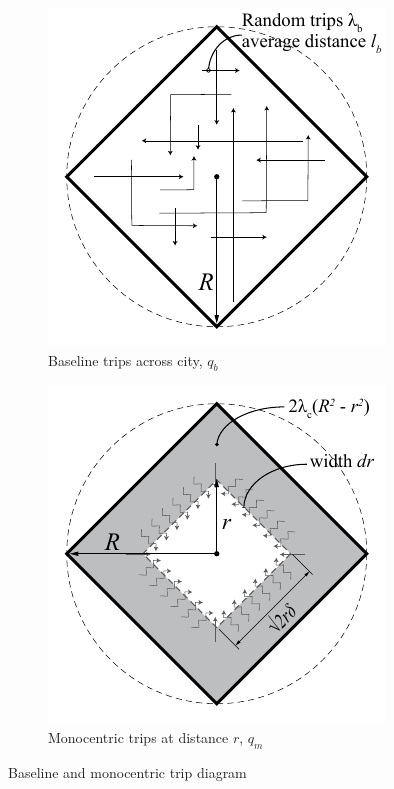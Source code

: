 \documentclass{elsarticle}\usepackage[]{graphicx}\usepackage[]{color}
\begin{document}
\begin{figure}[H]
	\centering
	\begin{subfigure}[b]{0.35\textwidth}
		\centering
		\includegraphics[width=\textwidth]{diagram_trips_base}
		\caption{Baseline trips across city, $q_b$}
		\label{fig:basetrips}
	\end{subfigure}
	\begin{subfigure}[b]{0.35\textwidth}
		\centering
		\includegraphics[width=\textwidth]{diagram_trips_mono}
		\caption{Monocentric trips at distance $r$, $q_m$}
		\label{fig:monotrips}
	\end{subfigure}
	\caption{Baseline and monocentric trip diagram}
\end{figure}
\end{document}
